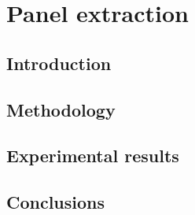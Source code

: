 \chapter{Panel extraction}
\label{chap:intro}
\graphicspath{{./chapters/4-pe/figs/}}

\section{Introduction}


\section{Methodology}


\section{Experimental results 
}


\section{Conclusions}

